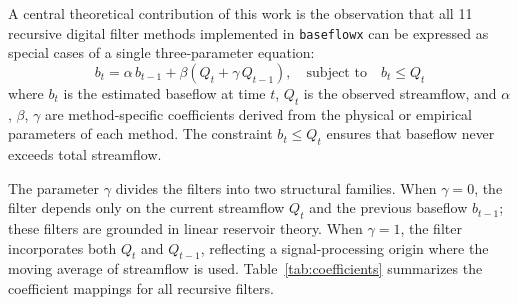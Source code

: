 \documentclass[hydrology,article,submit,pdftex,moreauthors]{Definitions/mdpi}
\begin{document}
A central theoretical contribution of this work is the observation that all 11 recursive digital filter methods implemented in \texttt{baseflowx} can be expressed as special cases of a single three-parameter equation:
\begin{equation}
\label{eq:generalized}
b_t = \alpha \, b_{t-1} + \beta \left( Q_t + \gamma \, Q_{t-1} \right), \quad \text{subject to} \quad b_t \leq Q_t
\end{equation}
where $b_t$ is the estimated baseflow at time $t$, $Q_t$ is the observed streamflow, and $\alpha$, $\beta$, $\gamma$ are method-specific coefficients derived from the physical or empirical parameters of each method. The constraint $b_t \leq Q_t$ ensures that baseflow never exceeds total streamflow.

The parameter $\gamma$ divides the filters into two structural families. When $\gamma = 0$, the filter depends only on the current streamflow $Q_t$ and the previous baseflow $b_{t-1}$; these filters are grounded in linear reservoir theory. When $\gamma = 1$, the filter incorporates both $Q_t$ and $Q_{t-1}$, reflecting a signal-processing origin where the moving average of streamflow is used. Table~\ref{tab:coefficients} summarizes the coefficient mappings for all recursive filters.
\end{document}
